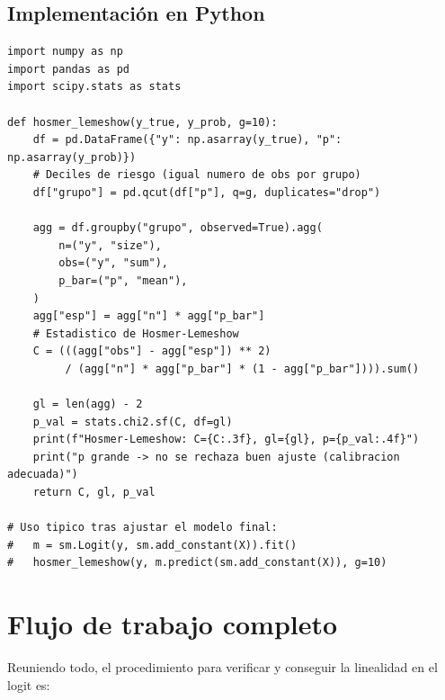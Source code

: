 \documentclass[11pt]{article}
\theoremstyle{plain}
\theoremstyle{definition}
\theoremstyle{remark}
\begin{document}
\subsection{Implementación en Python}

\begin{lstlisting}[style=py, caption={Test de Hosmer--Lemeshow.}]
import numpy as np
import pandas as pd
import scipy.stats as stats

def hosmer_lemeshow(y_true, y_prob, g=10):
    df = pd.DataFrame({"y": np.asarray(y_true), "p": np.asarray(y_prob)})
    # Deciles de riesgo (igual numero de obs por grupo)
    df["grupo"] = pd.qcut(df["p"], q=g, duplicates="drop")

    agg = df.groupby("grupo", observed=True).agg(
        n=("y", "size"),
        obs=("y", "sum"),
        p_bar=("p", "mean"),
    )
    agg["esp"] = agg["n"] * agg["p_bar"]
    # Estadistico de Hosmer-Lemeshow
    C = (((agg["obs"] - agg["esp"]) ** 2)
         / (agg["n"] * agg["p_bar"] * (1 - agg["p_bar"]))).sum()

    gl = len(agg) - 2
    p_val = stats.chi2.sf(C, df=gl)
    print(f"Hosmer-Lemeshow: C={C:.3f}, gl={gl}, p={p_val:.4f}")
    print("p grande -> no se rechaza buen ajuste (calibracion adecuada)")
    return C, gl, p_val

# Uso tipico tras ajustar el modelo final:
#   m = sm.Logit(y, sm.add_constant(X)).fit()
#   hosmer_lemeshow(y, m.predict(sm.add_constant(X)), g=10)
\end{lstlisting}

\section{Flujo de trabajo completo}\label{sec:flujo}

Reuniendo todo, el procedimiento para verificar y conseguir la linealidad en el
logit es:
\end{document}
